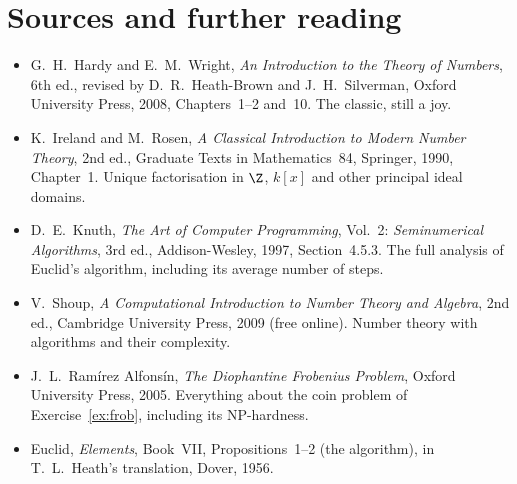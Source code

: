 \section*{Sources and further reading}

\begin{itemize}
\item G.~H.~Hardy and E.~M.~Wright, \emph{An Introduction to the Theory of Numbers}, 6th ed., revised by D.~R.~Heath-Brown and J.~H.~Silverman, Oxford University Press, 2008, Chapters~1--2 and~10. The classic, still a joy.
\item K.~Ireland and M.~Rosen, \emph{A Classical Introduction to Modern Number Theory}, 2nd ed., Graduate Texts in Mathematics~84, Springer, 1990, Chapter~1. Unique factorisation in $\Z$, $k[x]$ and other principal ideal domains.
\item D.~E.~Knuth, \emph{The Art of Computer Programming}, Vol.~2: \emph{Seminumerical Algorithms}, 3rd ed., Addison-Wesley, 1997, Section~4.5.3. The full analysis of Euclid's algorithm, including its average number of steps.
\item V.~Shoup, \emph{A Computational Introduction to Number Theory and Algebra}, 2nd ed., Cambridge University Press, 2009 (free online). Number theory with algorithms and their complexity.
\item J.~L.~Ram\'irez Alfons\'in, \emph{The Diophantine Frobenius Problem}, Oxford University Press, 2005. Everything about the coin problem of Exercise~\ref{ex:frob}, including its NP-hardness.
\item Euclid, \emph{Elements}, Book~VII, Propositions~1--2 (the algorithm), in T.~L.~Heath's translation, Dover, 1956.
\end{itemize}
